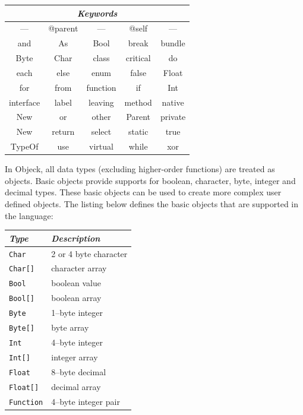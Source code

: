 \documentclass[11pt]{article}
\begin{document}
\begin{center}
  \begin{tabular}{ | c | c | c | c | c | }
    \hline
    \multicolumn{5}{|c|}{\emph{Keywords}} \\ \hline \hline
    --- & @parent & --- & @self & --- \\ \hline
    and & As & Bool & break & bundle \\ \hline
    Byte & Char & class & critical & do \\ \hline
    each & else & enum & false & Float \\ \hline
    for & from & function & if & Int \\ \hline
    interface & label & leaving & method & native \\ \hline
    New & or & other & Parent & private \\ \hline
    New & return & select & static & true \\ \hline
    TypeOf & use & virtual & while & xor \\ \hline
  \end{tabular}
\end{center}

In Objeck, all data types (excluding higher-order functions) are
treated as objects. Basic objects provide supports for boolean,
character, byte, integer and decimal types.  These basic objects can
be used to create more complex user defined objects.  The listing
below defines the basic objects that are supported in the language:

\begin{center}
  \begin{tabular}{| l | l |}
    \hline
    \emph{Type} & \emph{Description} \\ \hline \hline
    \texttt{Char} & 2 or 4 byte character \\ \hline
    \texttt{Char[]} &  character array \\ \hline
    \texttt{Bool} &  boolean value \\ \hline
    \texttt{Bool[]} &  boolean array \\ \hline
    \texttt{Byte} &  1--byte integer \\ \hline
    \texttt{Byte[]} &  byte array \\ \hline
    \texttt{Int} &  4--byte integer \\ \hline
    \texttt{Int[]} &  integer array \\ \hline
    \texttt{Float} &  8--byte decimal \\ \hline
    \texttt{Float[]} &  decimal array \\ \hline
    \texttt{Function} &  4--byte integer pair \\ \hline
  \end{tabular}
\end{center}
\end{document}
